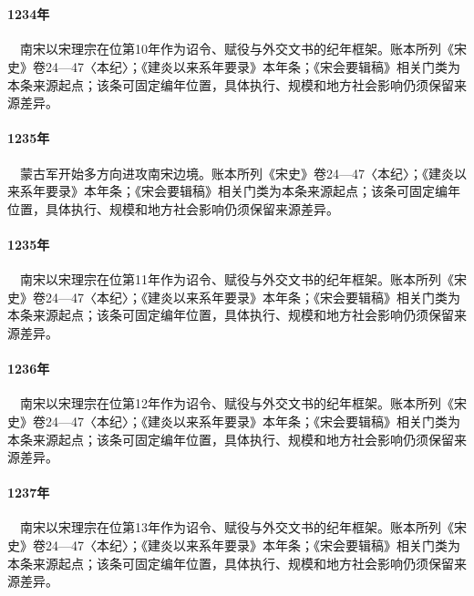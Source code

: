 \section{}

\paragraph{1234年}　南宋以宋理宗在位第10年作为诏令、赋役与外交文书的纪年框架。账本所列《宋史》卷24—47〈本纪〉；《建炎以来系年要录》本年条；《宋会要辑稿》相关门类为本条来源起点；该条可固定编年位置，具体执行、规模和地方社会影响仍须保留来源差异。

\paragraph{1235年}　蒙古军开始多方向进攻南宋边境。账本所列《宋史》卷24—47〈本纪〉；《建炎以来系年要录》本年条；《宋会要辑稿》相关门类为本条来源起点；该条可固定编年位置，具体执行、规模和地方社会影响仍须保留来源差异。

\paragraph{1235年}　南宋以宋理宗在位第11年作为诏令、赋役与外交文书的纪年框架。账本所列《宋史》卷24—47〈本纪〉；《建炎以来系年要录》本年条；《宋会要辑稿》相关门类为本条来源起点；该条可固定编年位置，具体执行、规模和地方社会影响仍须保留来源差异。

\paragraph{1236年}　南宋以宋理宗在位第12年作为诏令、赋役与外交文书的纪年框架。账本所列《宋史》卷24—47〈本纪〉；《建炎以来系年要录》本年条；《宋会要辑稿》相关门类为本条来源起点；该条可固定编年位置，具体执行、规模和地方社会影响仍须保留来源差异。

\paragraph{1237年}　南宋以宋理宗在位第13年作为诏令、赋役与外交文书的纪年框架。账本所列《宋史》卷24—47〈本纪〉；《建炎以来系年要录》本年条；《宋会要辑稿》相关门类为本条来源起点；该条可固定编年位置，具体执行、规模和地方社会影响仍须保留来源差异。


